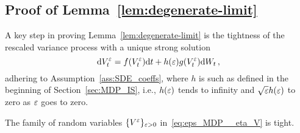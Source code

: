 \subsection{Proof of Lemma~\ref{lem:degenerate-limit}}\label{sec:lem:degenerate-limit_Proof}
A key step in proving Lemma~\ref{lem:degenerate-limit}
is the tightness of the rescaled variance process with a unique strong solution
\[
\mathrm{d} V_t^\varepsilon = f(V_t^\varepsilon)\mathrm{d} t + h(\varepsilon)g(V_t^\varepsilon)\mathrm{d} W_t\,,
\]
adhering to Assumption~\ref{ass:SDE_coeffs}, where $h$ is such as defined in the beginning of Section~\ref{sec:MDP_IS}, i.e., $h(\varepsilon)$ tends to infinity and $\sqrt{\varepsilon} h(\varepsilon)$ to zero as $\varepsilon$ goes to zero.
\begin{lemma}\label{lem:tightness}
The family of random variables $\{V^\varepsilon\}_{\varepsilon>0}$ in~\eqref{eq:eps_MDP__eta_V} is tight.
\end{lemma}

